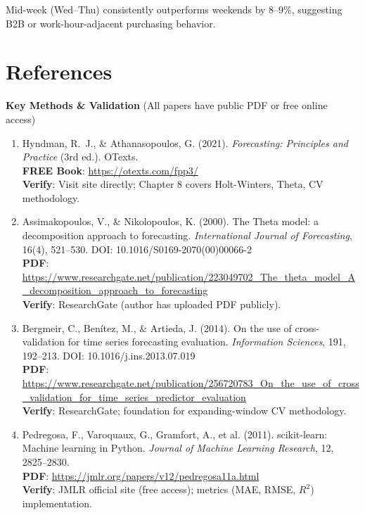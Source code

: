 \documentclass[12pt,a4paper]{article}
\begin{document}
Mid-week (Wed--Thu) consistently outperforms weekends by 8--9\%, suggesting B2B or work-hour-adjacent purchasing behavior.

\newpage

\section{References}

\noindent\textbf{Key Methods \& Validation} (All papers have public PDF or free online access)

\begin{enumerate}
  \item Hyndman, R.~J., \& Athanasopoulos, G. (2021). \textit{Forecasting: Principles and Practice} (3rd ed.). OTexts.\\
  \textbf{FREE Book}: \url{https://otexts.com/fpp3/}\\
  \checkmark \textbf{Verify}: Visit site directly; Chapter 8 covers Holt-Winters, Theta, CV methodology.

  \item Assimakopoulos, V., \& Nikolopoulos, K. (2000). The Theta model: a decomposition approach to forecasting. \textit{International Journal of Forecasting}, 16(4), 521--530. DOI: 10.1016/S0169-2070(00)00066-2\\
  \textbf{PDF}: \url{https://www.researchgate.net/publication/223049702_The_theta_model_A_decomposition_approach_to_forecasting}\\
  \checkmark \textbf{Verify}: ResearchGate (author has uploaded PDF publicly).

  \item Bergmeir, C., Ben\'itez, M., \& Artieda, J. (2014). On the use of cross-validation for time series forecasting evaluation. \textit{Information Sciences}, 191, 192--213. DOI: 10.1016/j.ins.2013.07.019\\
  \textbf{PDF}: \url{https://www.researchgate.net/publication/256720783_On_the_use_of_cross_validation_for_time_series_predictor_evaluation}\\
  \checkmark \textbf{Verify}: ResearchGate; foundation for expanding-window CV methodology.

  \item Pedregosa, F., Varoquaux, G., Gramfort, A., et al. (2011). scikit-learn: Machine learning in Python. \textit{Journal of Machine Learning Research}, 12, 2825--2830.\\
  \textbf{PDF}: \url{https://jmlr.org/papers/v12/pedregosa11a.html}\\
  \checkmark \textbf{Verify}: JMLR official site (free access); metrics (MAE, RMSE, $R^2$) implementation.


\end{enumerate}
\end{document}
